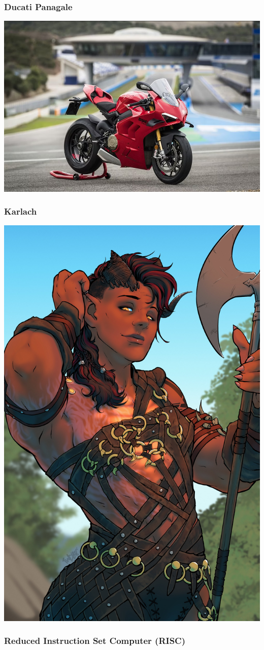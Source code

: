 \documentclass{beamer}
\begin{document}
\begin{frame}
	\frametitle{Ducati Panagale}
	\includegraphics[scale=0.3]{panagale1.png}
\end{frame}

\begin{frame}
	\frametitle{Karlach}
	\includegraphics[scale=0.05]{karlach.jpeg}
\end{frame}

\begin{frame}
	\frametitle{Reduced Instruction Set Computer (RISC)}

\end{frame}
\end{document}
